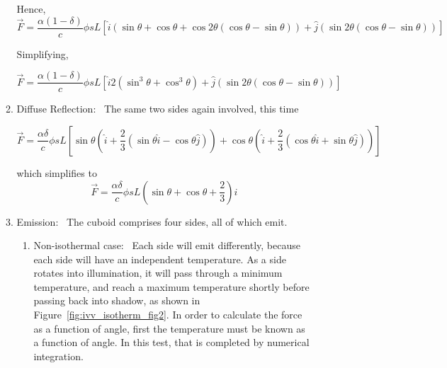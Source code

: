 \begin{description}
\begin{enumerate}
\begin{enumerate}
            Hence,
            \begin{equation*}
            \vec {F}=\frac{\alpha (1-\delta)}{c}\phi sL
            \left[\hat{i}\left(\sin \theta +\cos \theta +\cos 2\theta
            \left(\cos \theta -\sin \theta \right)\right)+
            \hat{j} \left( \sin 2 \theta
            \left(\cos \theta -\sin \theta \right)\right) \right]
            \end{equation*}

            Simplifying,

            \begin{equation}
              \vec {F}=\frac{\alpha (1-\delta)}{c}\phi sL \left[
              \hat{i}2\left(\sin^{3} \theta +\cos^3 \theta \right)+
              \hat{j}\left(\sin 2\theta \left(\cos \theta -\sin \theta
              \right)\right) \right]
            \end{equation}

           \item{Diffuse Reflection:}\ \newline
            The same two sides again involved, this time

            \begin{equation*}
            \vec {F}=\frac{\alpha \delta}{c}\phi sL
            \left[
              \sin \theta
              \left(
                \hat {i} + \frac{2}{3}
                \left(
                  \sin \theta \hat {i} - \cos \theta \hat {j}
                \right)
              \right)
              + \cos \theta
              \left(
                \hat {i} + \frac{2}{3}
                \left(
                  \cos \theta \hat {i} + \sin \theta \hat {j}
                \right)
              \right)
            \right]
            \end{equation*}

            which simplifies to
            \begin{equation}
              \vec {F}=\frac{\alpha \delta}{c}\phi sL \left( \sin \theta +
              \cos \theta + \frac{2}{3} \right) \hat {i}
            \end{equation}

          \item{Emission:}\ \newline
            The cuboid comprises four sides, all of which emit.
            \begin{enumerate}
            \item{Non-isothermal case:}\ \newline
            Each side will emit differently, because each side will have an
            independent temperature.  As a side rotates into illumination, it
            will pass through a minimum temperature, and reach a maximum
            temperature shortly before passing back into shadow, as shown in
            Figure~\ref{fig:ivv_isotherm_fig2}.
            In order to calculate the force as a function of
            angle, first the temperature must be known as a function of angle.
            In this test, that is completed by numerical integration.


\end{enumerate}
\end{enumerate}
\end{enumerate}
\end{description}
